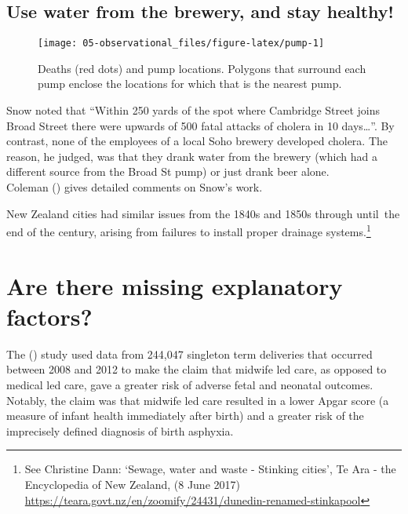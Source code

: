 \documentclass[
  10ptls,
  b5paper]{book}
\begin{document}
\subsection*{Use water from the brewery, and stay healthy!}\label{use-water-from-the-brewery-and-stay-healthy}

\begin{figure}[H]

{\centering \texttt{[image: 05-observational\_files/figure-latex/pump-1]} 

}

\caption{Deaths (red dots) and pump locations.  Polygons that surround
each pump enclose the locations for which that is the nearest pump.}\label{fig:pump}
\end{figure}

Snow noted that ``Within 250 yards of the spot where Cambridge Street joins Broad Street there were upwards of 500 fatal attacks of cholera in 10 days\ldots{}''. By contrast, none of the employees of a local Soho brewery developed cholera. The reason, he judged, was that they drank water from the brewery (which had a different source from the Broad St pump) or just drank beer alone.\\
Coleman () gives detailed comments on Snow's work.

New Zealand cities had similar issues from the 1840s and 1850s through until~the end of the century, arising from failures to install proper drainage systems.\footnote{See Christine Dann: `Sewage, water and waste - Stinking cities', Te Ara - the Encyclopedia of New Zealand, (8 June 2017) \url{https://teara.govt.nz/en/zoomify/24431/dunedin-renamed-stinkapool}}

\section{Are there missing explanatory factors?}\label{sec:maternity}

The () study used data from 244,047 singleton term deliveries that occurred between 2008 and 2012 to make the claim that midwife led care, as opposed to medical led care, gave a greater risk of adverse fetal and neonatal outcomes. Notably, the claim was that midwife led care resulted in a lower Apgar score (a measure of infant health immediately after birth) and a greater risk of the imprecisely defined diagnosis of birth asphyxia.
\end{document}
